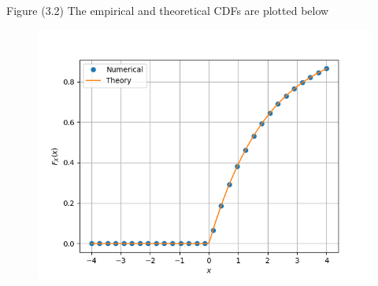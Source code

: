 \documentclass{beamer}
\begin{document}
\begin{frame}{Figure (3.2)}
    The empirical and theoretical CDFs are plotted below
	\begin{figure}
		\centerline{\includegraphics[width=\textheight]{./figures/CDF_log.png}}
		\label{fig4}
	\end{figure}	
\end{frame}
\end{document}
